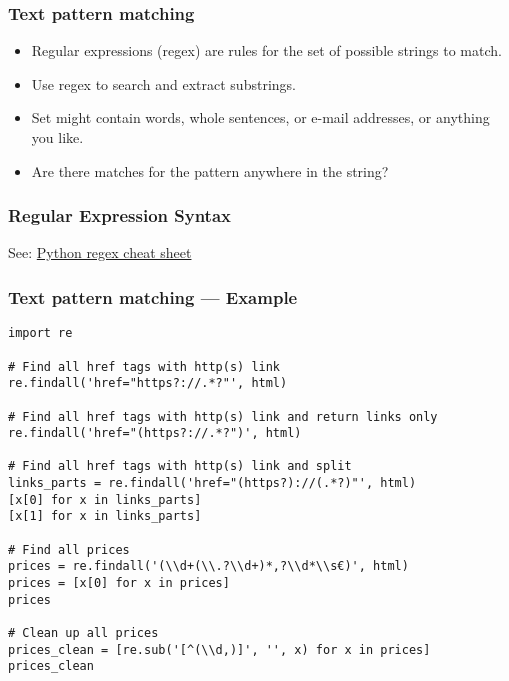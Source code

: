 
\begin{frame}
    \frametitle{Text pattern matching}
    \begin{itemize}
        \item Regular expressions (regex) are rules for the set of
        possible strings to match.
        \item Use regex to search and extract substrings.
        \item Set might contain words, whole sentences, or e-mail
        addresses, or anything you like.
        \item Are there matches for the pattern anywhere in the string?
    \end{itemize}
\end{frame}

\begin{frame}
    \frametitle{Regular Expression Syntax}

    See: \href{https://www.dataquest.io/wp-content/uploads/2019/03/python-regular-expressions-cheat-sheet.pdf}{Python regex cheat sheet}
\end{frame}

\begin{frame}[fragile]
    \frametitle{Text pattern matching --- Example}
\begin{verbatim}
import re

# Find all href tags with http(s) link
re.findall('href="https?://.*?"', html)

# Find all href tags with http(s) link and return links only
re.findall('href="(https?://.*?")', html)

# Find all href tags with http(s) link and split
links_parts = re.findall('href="(https?)://(.*?)"', html)
[x[0] for x in links_parts]
[x[1] for x in links_parts]

# Find all prices
prices = re.findall('(\\d+(\\.?\\d+)*,?\\d*\\s€)', html)
prices = [x[0] for x in prices]
prices

# Clean up all prices
prices_clean = [re.sub('[^(\\d,)]', '', x) for x in prices]
prices_clean
\end{verbatim}
\end{frame}